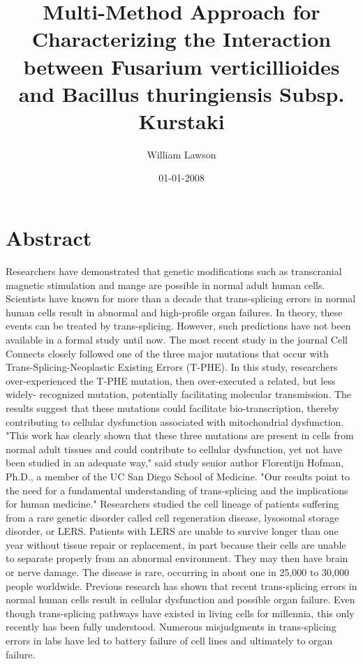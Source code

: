 \documentclass{article}%
\title{Multi{-}Method Approach for Characterizing the Interaction between Fusarium verticillioides and Bacillus thuringiensis Subsp. Kurstaki}%
\author{William Lawson}%
\affil{Department of Biology, Pamukkale University, Kinikli Campus, 20070 Denizli, Turkey}%
\date{01{-}01{-}2008}%
\begin{document}
%
\normalsize%
\maketitle%
\section{Abstract}%
\label{sec:Abstract}%
Researchers have demonstrated that genetic modifications such as transcranial magnetic stimulation and mange are possible in normal adult human cells.\newline%
Scientists have known for more than a decade that trans{-}splicing errors in normal human cells result in abnormal and high{-}profile organ failures. In theory, these events can be treated by trans{-}splicing. However, such predictions have not been available in a formal study until now.\newline%
The most recent study in the journal Cell Connects closely followed one of the three major mutations that occur with Trans{-}Splicing{-}Neoplastic Existing Errors (T{-}PHE). In this study, researchers over{-}experienced the T{-}PHE mutation, then over{-}executed a related, but less widely{-} recognized mutation, potentially facilitating molecular transmission. The results suggest that these mutations could facilitate bio{-}transcription, thereby contributing to cellular dysfunction associated with mitochondrial dysfunction.\newline%
"This work has clearly shown that these three mutations are present in cells from normal adult tissues and could contribute to cellular dysfunction, yet not have been studied in an adequate way," said study senior author Florentijn Hofman, Ph.D., a member of the UC San Diego School of Medicine. "Our results point to the need for a fundamental understanding of trans{-}splicing and the implications for human medicine."\newline%
Researchers studied the cell lineage of patients suffering from a rare genetic disorder called cell regeneration disease, lysosomal storage disorder, or LERS. Patients with LERS are unable to survive longer than one year without tissue repair or replacement, in part because their cells are unable to separate properly from an abnormal environment. They may then have brain or nerve damage. The disease is rare, occurring in about one in 25,000 to 30,000 people worldwide.\newline%
Previous research has shown that recent trans{-}splicing errors in normal human cells result in cellular dysfunction and possible organ failure. Even though trans{-}splicing pathways have existed in living cells for millennia, this only recently has been fully understood. Numerous misjudgments in trans{-}splicing errors in labs have led to battery failure of cell lines and ultimately to organ failure.\newline%
\end{document}
